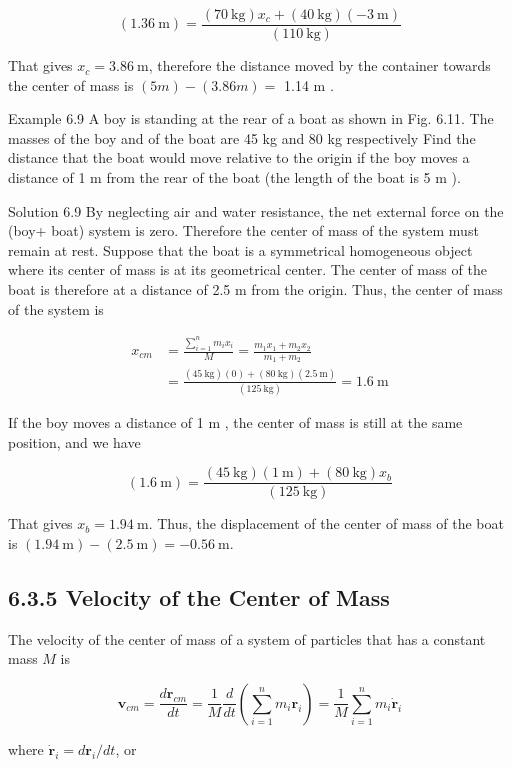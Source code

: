 \documentclass[10pt]{article}
\begin{document}
$$
(1.36 \mathrm{~m})=\frac{(70 \mathrm{~kg}) x_{c}+(40 \mathrm{~kg})(-3 \mathrm{~m})}{(110 \mathrm{~kg})}
$$

That gives $x_{c}=3.86 \mathrm{~m}$, therefore the distance moved by the container towards the center of mass is $(5 m)-(3.86 m)=$ 1.14 m .

Example 6.9 A boy is standing at the rear of a boat as shown in Fig. 6.11. The masses of the boy and of the boat are 45 kg and 80 kg respectively Find the distance that the boat would move relative to the origin if the boy moves a distance of 1 m from the rear of the boat (the length of the boat is 5 m ).

Solution 6.9 By neglecting air and water resistance, the net external force on the (boy+ boat) system is zero. Therefore the center of mass of the system must remain at rest. Suppose that the boat is a symmetrical homogeneous object where its center of mass is at its geometrical center. The center of mass of the boat is therefore at a distance of 2.5 m from the origin. Thus, the center of mass of the system is

$$
\begin{aligned}
x_{c m} & =\frac{\sum_{i=1}^{n} m_{i} x_{i}}{M}=\frac{m_{1} x_{1}+m_{2} x_{2}}{m_{1}+m_{2}} \\
& =\frac{(45 \mathrm{~kg})(0)+(80 \mathrm{~kg})(2.5 \mathrm{~m})}{(125 \mathrm{~kg})}=1.6 \mathrm{~m}
\end{aligned}
$$

If the boy moves a distance of 1 m , the center of mass is still at the same position, and we have

$$
(1.6 \mathrm{~m})=\frac{(45 \mathrm{~kg})(1 \mathrm{~m})+(80 \mathrm{~kg}) x_{b}}{(125 \mathrm{~kg})}
$$

That gives $x_{b}=1.94 \mathrm{~m}$. Thus, the displacement of the center of mass of the boat is $(1.94 \mathrm{~m})-(2.5 \mathrm{~m})=-0.56 \mathrm{~m}$.

\subsection*{6.3.5 Velocity of the Center of Mass}
The velocity of the center of mass of a system of particles that has a constant mass $M$ is

$$
\mathbf{v}_{c m}=\frac{d \mathbf{r}_{c m}}{d t}=\frac{1}{M} \frac{d}{d t}\left(\sum_{i=1}^{n} m_{i} \mathbf{r}_{i}\right)=\frac{1}{M} \sum_{i=1}^{n} m_{i} \dot{\mathbf{r}}_{i}
$$

where $\dot{\mathbf{r}}_{i}=d \mathbf{r}_{i} / d t$, or
\end{document}
